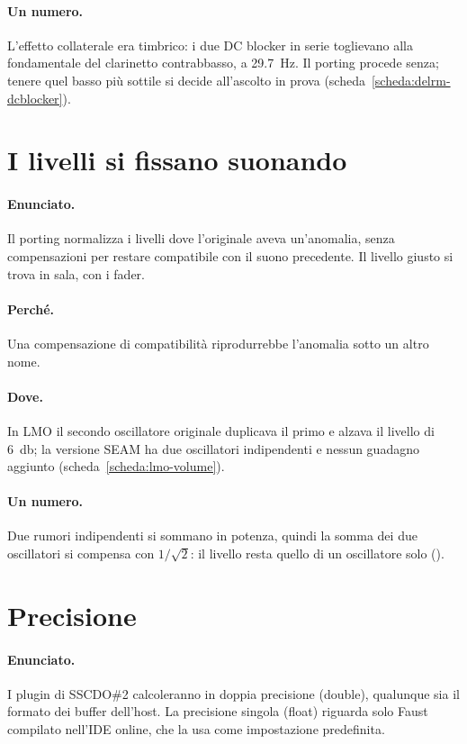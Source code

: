 \paragraph{Un numero.}
L'effetto collaterale era timbrico: i due DC blocker in serie toglievano  alla fondamentale del clarinetto contrabbasso, a \qty{29.7}{\hertz}.
Il porting procede senza; tenere quel basso più sottile si decide all'ascolto in prova (scheda~\ref{scheda:delrm-dcblocker}).

\section{I livelli si fissano suonando}\label{sec:principio-livelli}
\paragraph{Enunciato.}
Il porting normalizza i livelli dove l'originale aveva un'anomalia, senza compensazioni per restare compatibile con il suono precedente.
Il livello giusto si trova in sala, con i fader.

\paragraph{Perché.}
Una compensazione di compatibilità riprodurrebbe l'anomalia sotto un altro nome.

\paragraph{Dove.}
In LMO il secondo oscillatore originale duplicava il primo e alzava il livello di \qty{6}{\decibel}; la versione SEAM ha due oscillatori indipendenti e nessun guadagno aggiunto (scheda~\ref{scheda:lmo-volume}).

\paragraph{Un numero.}
Due rumori indipendenti si sommano in potenza, quindi la somma dei due oscillatori si compensa con $1/\sqrt{2}$: il livello resta quello di un oscillatore solo ().

\section{Precisione}\label{sec:principio-precisione}
\paragraph{Enunciato.}
I plugin di SSCDO\#2 calcoleranno in doppia precisione (double), qualunque sia il formato dei buffer dell'host.
La precisione singola (float) riguarda solo Faust compilato nell'IDE online, che la usa come impostazione predefinita.

